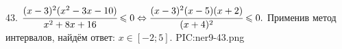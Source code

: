 43. $\cfrac{(x-3)^2(x^2-3x-10)}{x^2+8x+16}\leqslant0\Leftrightarrow\cfrac{(x-3)^2(x-5)(x+2)}{(x+4)^2}\leqslant0.$ Применив метод интервалов, найдём ответ: $x\in[-2;5].$
{{PIC:ner9-43.png}}\\
